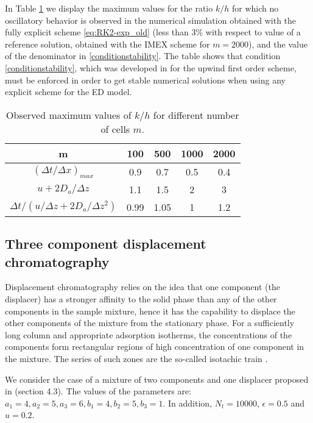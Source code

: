 \documentclass[preprint]{elsarticle}
\theoremstyle{definition}
\begin{document}
In  Table \ref{tabla} we display the maximum values  for the ratio
$k/h$ for which no oscillatory behavior is observed in the numerical
simulation obtained with the fully explicit scheme \eqref{eq:RK2-exp_old}
(less than 3\% 
with respect to value of a reference solution, obtained with the IMEX
scheme for $m=2000$), and the value of the denominator in
\eqref{conditionstability}. The table shows that  condition
\eqref{conditionstability}, which was 
developed in \cite{Donat1} for the upwind first order scheme,  must be
enforced   in order to get stable numerical solutions when using any
explicit scheme for the ED model. 


\begin{table}[htbp]
\begin{center}
\begin{tabular}{|c|c|c|c|c|}
\hline
m & 100 & 500 & 1000 & 2000 \\ \hline
 $(\Delta t/\Delta x)_{max}$ & 0.9 & 0.7 & 0.5 & 0.4 \\ \hline
$u+2 D_a/\Delta z$ & 1.1  & 1.5 & 2 & 3 \\ \hline 
$\Delta t/(u/\Delta z+2 D_a/\Delta z^2)$ & 0.99  & 1.05 & 1 & 1.2 \\ \hline 
\end{tabular}
\caption{Observed maximum values of $k/h$ for different number of cells $m$.}
\label{tabla}
\end{center}
\end{table}




 


\subsection{Three component displacement chromatography}

Displacement chromatography relies on the idea that one 
component  (the displacer) has  a
stronger affinity to the solid phase than any of the other components
in the sample mixture, hence it has the capability to displace the other
components of the mixture from the stationary phase.  For a
sufficiently long column and appropriate 
adsorption isotherms, the concentrations of the components form
rectangular regions of high concentration of one component in the
mixture. The series of such zones  are the
so-called isotachic train \cite{cazes2001encyclopedia}.

We consider  the case of a mixture of two components and one
displacer proposed in \cite{Javeed} (section
4.3). The values of the parameters are:
$a_1=4, a_2=5, a_3=6, b_1=4,b_2=5,b_3=1$. In addition, $N_t=10000$,
$\epsilon=0.5$ and $u=0.2$. 
\end{document}
